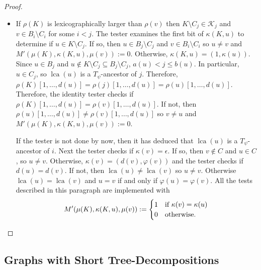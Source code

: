 \documentclass{patmorin}
\renewcommand{\le}{\leqslant}
\DeclareMathOperator{\lca}{lca}
\newcommand{\calG}{\mathcal{G}}
\newcommand{\calK}{\mathcal{K}}
\begin{document}
\begin{proof}
\begin{itemize}
       \item If $\rho(K)$ is lexicographically larger than $\rho(v)$ then $K\setminus C_j\in\calK_j$ and $v\in B_i\setminus C_i$ for some $i < j$.  The tester examines the first bit of $\kappa(K,u)$ to determine if $u\in K\setminus C_j$.  If so, then $u\in B_j\setminus C_j$ and $v\in B_i\setminus C_i$ so $u\neq v$ and $M'(\mu(K),\kappa(K,u),\mu(v)):=0$.  Otherwise, $\kappa(K,u)=(1,\kappa(u))$.  Since $u\in B_j$ and $u\not\in K\setminus C_j\subseteq B_j\setminus C_j$, $a(u) < j \le b(u)$.  In particular, $u\in C_j$, so $\lca(u)$ is a $T_\psi$-ancestor of $j$.   Therefore, $\rho(K)[1,\ldots,d(u)]=\rho(j)[1,\ldots,d(u)]=\rho(u)[1,\ldots,d(u)]$.  Therefore, the identity tester checks if $\rho(K)[1,\ldots,d(u)]=\rho(v)[1,\ldots,d(u)]$.  If not, then $\rho(u)[1,\ldots,d(u)]\neq\rho(v)[1,\ldots,d(u)]$ so $v\neq u$ and $M'(\mu(K),\kappa(K,u),\mu(v)):=0$.  
       
       If the tester is not done by now, then it has deduced that $\lca(u)$ is a $T_\psi$-ancestor of $i$.  Next the tester checks if $\kappa(v)=\epsilon$. If so, then $v\not\in C$ and $u\in C$, so $u\neq v$.  Otherwise, $\kappa(v)=(d(v),\varphi(v))$ and the tester checks if $d(u)=d(v)$.  If not, then $\lca(u)\neq\lca(v)$ so $u\neq v$.  Otherwise $\lca(u)=\lca(v)$ and $u=v$ if and only if $\varphi(u)=\varphi(v)$. All the tests described in this paragraph are implemented with
       \[
          M'(\mu(K),\kappa(K,u),\mu(v)):=
          \begin{cases}
              1 & \text{if $\kappa(v)=\kappa(u)$} \\
              0 & \text{otherwise.} 
          \end{cases} \qedhere
       \]
     \end{itemize}
  \end{proof}




\subsection{Graphs with Short Tree-Decompositions}
\end{document}
